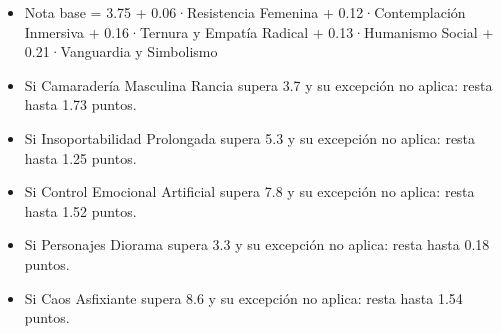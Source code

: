 \begin{itemize}
\item Nota base = 3.75 + 0.06·Resistencia Femenina + 0.12·Contemplación Inmersiva + 0.16·Ternura y Empatía Radical + 0.13·Humanismo Social + 0.21·Vanguardia y Simbolismo
\item Si Camaradería Masculina Rancia supera 3.7 y su excepción no aplica: resta hasta 1.73 puntos.
\item Si Insoportabilidad Prolongada supera 5.3 y su excepción no aplica: resta hasta 1.25 puntos.
\item Si Control Emocional Artificial supera 7.8 y su excepción no aplica: resta hasta 1.52 puntos.
\item Si Personajes Diorama supera 3.3 y su excepción no aplica: resta hasta 0.18 puntos.
\item Si Caos Asfixiante supera 8.6 y su excepción no aplica: resta hasta 1.54 puntos.
\end{itemize}
